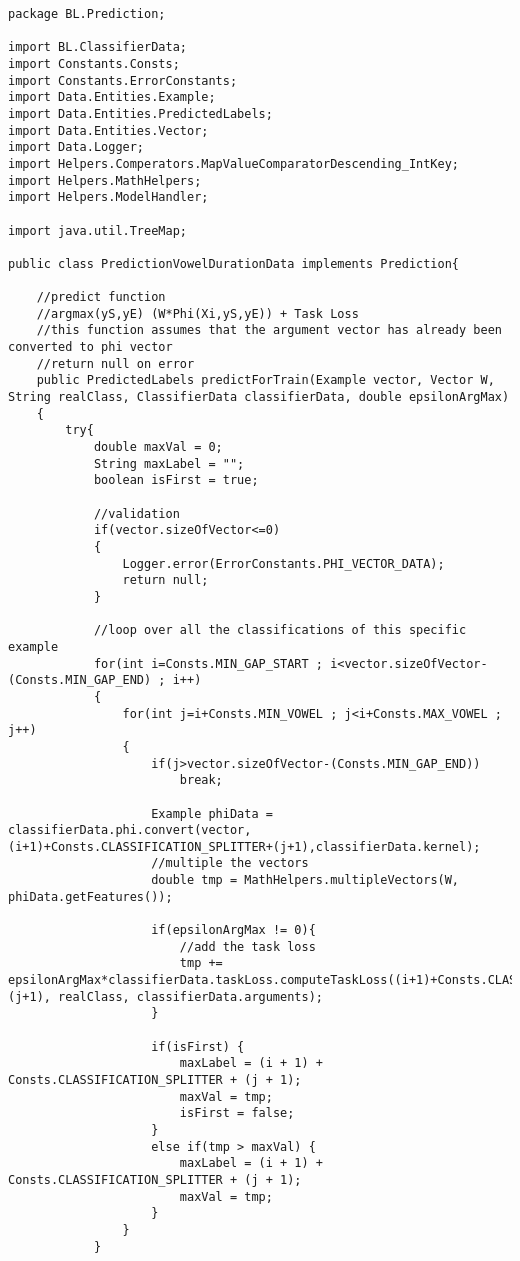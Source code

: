 \documentclass[11pt, oneside]{article}   	%
\begin{document}
\begin{lstlisting}
package BL.Prediction;

import BL.ClassifierData;
import Constants.Consts;
import Constants.ErrorConstants;
import Data.Entities.Example;
import Data.Entities.PredictedLabels;
import Data.Entities.Vector;
import Data.Logger;
import Helpers.Comperators.MapValueComparatorDescending_IntKey;
import Helpers.MathHelpers;
import Helpers.ModelHandler;

import java.util.TreeMap;

public class PredictionVowelDurationData implements Prediction{

    //predict function
    //argmax(yS,yE) (W*Phi(Xi,yS,yE)) + Task Loss
    //this function assumes that the argument vector has already been converted to phi vector
    //return null on error
    public PredictedLabels predictForTrain(Example vector, Vector W, String realClass, ClassifierData classifierData, double epsilonArgMax)
    {
        try{
            double maxVal = 0;
            String maxLabel = "";
            boolean isFirst = true;

            //validation
            if(vector.sizeOfVector<=0)
            {
                Logger.error(ErrorConstants.PHI_VECTOR_DATA);
                return null;
            }

            //loop over all the classifications of this specific example
            for(int i=Consts.MIN_GAP_START ; i<vector.sizeOfVector-(Consts.MIN_GAP_END) ; i++)
            {
                for(int j=i+Consts.MIN_VOWEL ; j<i+Consts.MAX_VOWEL ; j++)
                {
                    if(j>vector.sizeOfVector-(Consts.MIN_GAP_END))
                        break;

                    Example phiData = classifierData.phi.convert(vector,(i+1)+Consts.CLASSIFICATION_SPLITTER+(j+1),classifierData.kernel);
                    //multiple the vectors
                    double tmp = MathHelpers.multipleVectors(W, phiData.getFeatures());

                    if(epsilonArgMax != 0){
                        //add the task loss
                        tmp += epsilonArgMax*classifierData.taskLoss.computeTaskLoss((i+1)+Consts.CLASSIFICATION_SPLITTER+(j+1), realClass, classifierData.arguments);
                    }

                    if(isFirst) {
                        maxLabel = (i + 1) + Consts.CLASSIFICATION_SPLITTER + (j + 1);
                        maxVal = tmp;
                        isFirst = false;
                    }
                    else if(tmp > maxVal) {
                        maxLabel = (i + 1) + Consts.CLASSIFICATION_SPLITTER + (j + 1);
                        maxVal = tmp;
                    }
                }
            }


\end{lstlisting}
\end{document}
